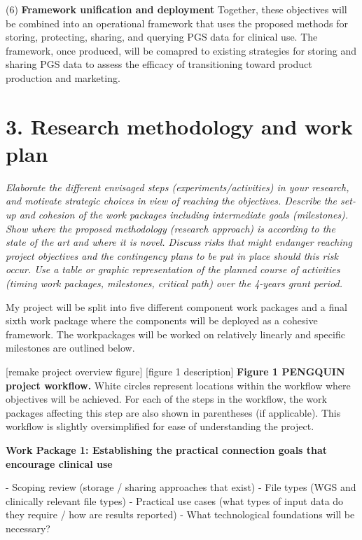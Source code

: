\documentclass[a4paper,11pt]{article}
\begin{document}


(6) \textbf{Framework unification and deployment}
Together, these objectives will be combined into an operational framework that uses the proposed methods for storing, protecting, sharing, and querying PGS data for clinical use. The framework, once produced, will be comapred to existing strategies for storing and sharing PGS data to assess the efficacy of transitioning toward product production and marketing.


\section{3. Research methodology and work plan}
\textit{Elaborate the different envisaged steps (experiments/activities) in your research, and motivate strategic choices in view of reaching the objectives. Describe the set-up and cohesion of the work packages including intermediate goals (milestones).
Show where the proposed methodology (research approach) is according to the state of the art and where it is novel. Discuss risks that might endanger reaching project objectives and the contingency plans to be put in place should this risk occur.
Use a table or graphic representation of the planned course of activities (timing work packages, milestones, critical path) over the 4-years grant period.}

My project will be split into five different component work packages and a final sixth work package where the components will be deployed as a cohesive framework. The workpackages will be worked on relatively linearly and specific milestones are outlined below.


[remake project overview figure]
[figure 1 description]
\textbf{Figure 1 PENGQUIN project workflow.} 
White circles represent locations within the workflow where objectives will be achieved. 
For each of the steps in the workflow, the work packages affecting this step are also shown in parentheses (if applicable). 
This workflow is slightly oversimplified for ease of understanding the project.


\textbf{Work Package 1: Establishing the practical connection goals that encourage clinical use}

- Scoping review (storage / sharing approaches that exist)
- File types (WGS and clinically relevant file types)
- Practical use cases (what types of input data do they require / how are results reported)
- What technological foundations will be necessary?
\end{document}
